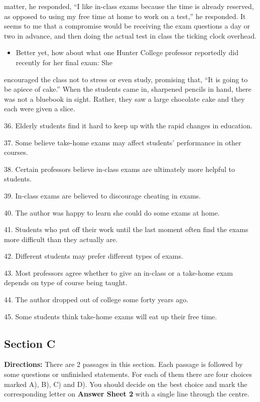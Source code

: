 \documentclass[UTF8,11pt]{ctexart}
\begin{document}
matter, he responded, “I like in-class exams because the time is already reserved, as opposed to using my free time at home to work on a test,” he responded. It seems to me that a compromise would be receiving the exam questions a day or two in advance, and then doing the actual test in class the ticking clock overhead.


\begin{itemize}[leftmargin=2em,itemsep=.2em,topsep=.4em]\item[K.] Better yet, how about what one Hunter College professor reportedly did recently for her final exam: She
\end{itemize}

encouraged the class not to stress or even study, promising that, “It is going to be apiece of cake.” When the students came in, sharpened pencils in hand, there was not a bluebook in sight. Rather, they saw a large chocolate cake and they each were given a slice.


36. Elderly students find it hard to keep up with the rapid changes in education.


37. Some believe take-home exams may affect students' performance in other courses.


38. Certain professors believe in-class exams are ultimately more helpful to students.


39. In-class exams are believed to discourage cheating in exams.


40. The author was happy to learn she could do some exams at home.


41. Students who put off their work until the last moment often find the exams more difficult than they actually are.


42. Different students may prefer different types of exams.


43. Most professors agree whether to give an in-class or a take-home exam depends on type of course being taught.


44. The author dropped out of college some forty years ago.


45. Some students think take-home exams will eat up their free time.


\subsection*{\textbf{Section C}}


\textbf{Directions:} There are 2 passages in this section. Each passage is followed by some questions or unfinished statements. For each of them there are four choices marked A), B), C) and D). You should decide on the best choice and mark the corresponding letter on\textbf{ Answer Sheet 2} with a single line through the centre.
\end{document}

